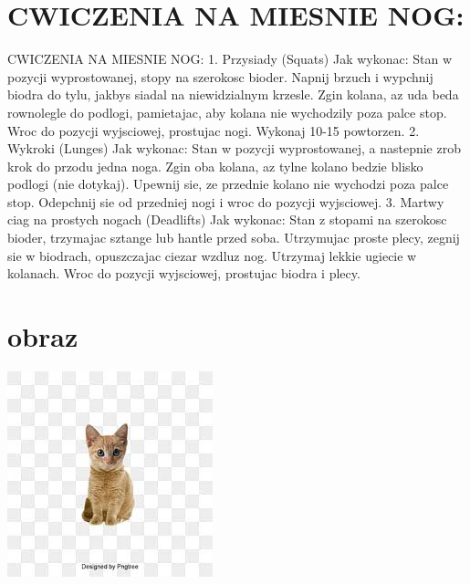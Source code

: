 \documentclass{beamer}
\begin{document}
\section{CWICZENIA NA MIESNIE NOG:}
\begin{frame}{CWICZENIA NA MIESNIE NOG:}
1. Przysiady (Squats)
Jak wykonac:
Stan w pozycji wyprostowanej, stopy na szerokosc bioder.
Napnij brzuch i wypchnij biodra do tylu, jakbys siadal na niewidzialnym krzesle.
Zgin kolana, az uda beda rownolegle do podlogi, pamietajac, aby kolana nie wychodzily poza palce stop.
Wroc do pozycji wyjsciowej, prostujac nogi.
Wykonaj 10-15 powtorzen.
2. Wykroki (Lunges)
Jak wykonac:
Stan w pozycji wyprostowanej, a nastepnie zrob krok do przodu jedna noga.
Zgin oba kolana, az tylne kolano bedzie blisko podlogi (nie dotykaj).
Upewnij sie, ze przednie kolano nie wychodzi poza palce stop.
Odepchnij sie od przedniej nogi i wroc do pozycji wyjsciowej.
3. Martwy ciag na prostych nogach (Deadlifts)
Jak wykonac:
Stan z stopami na szerokosc bioder, trzymajac sztange lub hantle przed soba.
Utrzymujac proste plecy, zegnij sie w biodrach, opuszczajac ciezar wzdluz nog.
Utrzymaj lekkie ugiecie w kolanach.
Wroc do pozycji wyjsciowej, prostujac biodra i plecy.
\end{frame}
\section{obraz}
\begin{frame}
\includegraphics{Bez.png}
\end{frame}
\end{document}

